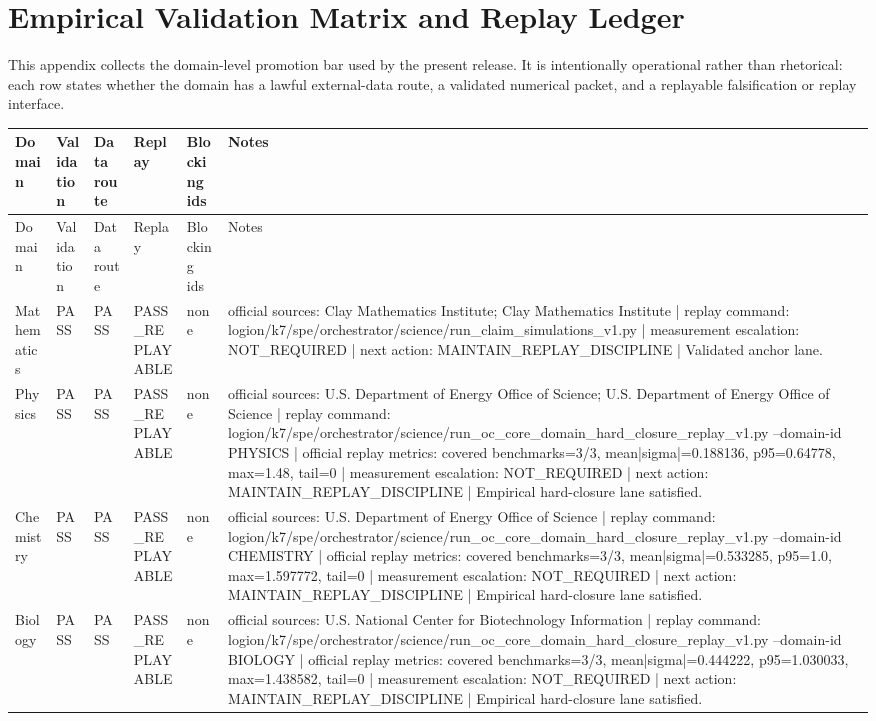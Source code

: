 \section{Empirical Validation Matrix and Replay Ledger}

This appendix collects the domain-level promotion bar used by the present release. It is intentionally operational rather than rhetorical: each row states whether the domain has a lawful external-data route, a validated numerical packet, and a replayable falsification or replay interface.

\begin{longtable}{p{}p{}p{}p{}p{}p{}}
\toprule
Domain & Validation & Data route & Replay & Blocking ids & Notes \\
\midrule
\endfirsthead
\toprule
Domain & Validation & Data route & Replay & Blocking ids & Notes \\
\midrule
\endhead
Mathematics & PASS & PASS & PASS\_REPLAYABLE & none & official sources: Clay Mathematics Institute; Clay Mathematics Institute | replay command: logion/k7/spe/orchestrator/science/run\_claim\_simulations\_v1.py | measurement escalation: NOT\_REQUIRED | next action: MAINTAIN\_REPLAY\_DISCIPLINE | Validated anchor lane. \\
Physics & PASS & PASS & PASS\_REPLAYABLE & none & official sources: U.S. Department of Energy Office of Science; U.S. Department of Energy Office of Science | replay command: logion/k7/spe/orchestrator/science/run\_oc\_core\_domain\_hard\_closure\_replay\_v1.py --domain-id PHYSICS | official replay metrics: covered benchmarks=3/3, mean|sigma|=0.188136, p95=0.64778, max=1.48, tail=0 | measurement escalation: NOT\_REQUIRED | next action: MAINTAIN\_REPLAY\_DISCIPLINE | Empirical hard-closure lane satisfied. \\
Chemistry & PASS & PASS & PASS\_REPLAYABLE & none & official sources: U.S. Department of Energy Office of Science | replay command: logion/k7/spe/orchestrator/science/run\_oc\_core\_domain\_hard\_closure\_replay\_v1.py --domain-id CHEMISTRY | official replay metrics: covered benchmarks=3/3, mean|sigma|=0.533285, p95=1.0, max=1.597772, tail=0 | measurement escalation: NOT\_REQUIRED | next action: MAINTAIN\_REPLAY\_DISCIPLINE | Empirical hard-closure lane satisfied. \\
Biology & PASS & PASS & PASS\_REPLAYABLE & none & official sources: U.S. National Center for Biotechnology Information | replay command: logion/k7/spe/orchestrator/science/run\_oc\_core\_domain\_hard\_closure\_replay\_v1.py --domain-id BIOLOGY | official replay metrics: covered benchmarks=3/3, mean|sigma|=0.444222, p95=1.030033, max=1.438582, tail=0 | measurement escalation: NOT\_REQUIRED | next action: MAINTAIN\_REPLAY\_DISCIPLINE | Empirical hard-closure lane satisfied. \\

\end{longtable}
